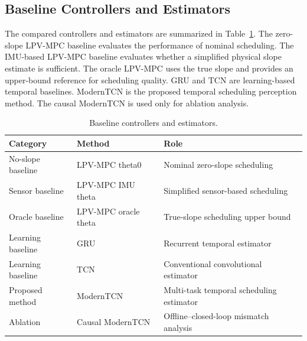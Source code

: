 \documentclass{ieeeaccess}
\begin{document}
\subsection{Baseline Controllers and Estimators}



The compared controllers and estimators are summarized in Table~\ref{tab:baseline_definitions}. The zero-slope LPV-MPC baseline evaluates the performance of nominal scheduling. The IMU-based LPV-MPC baseline evaluates whether a simplified physical slope estimate is sufficient. The oracle LPV-MPC uses the true slope and provides an upper-bound reference for scheduling quality. GRU and TCN are learning-based temporal baselines. ModernTCN is the proposed temporal scheduling perception method. The causal ModernTCN is used only for ablation analysis.



\begin{table}[t]

\centering

\caption{Baseline controllers and estimators.}

\label{tab:baseline_definitions}

\begin{tabular}{lll}

\hline

Category & Method & Role \\

\hline

No-slope baseline & LPV-MPC theta0 & Nominal zero-slope scheduling \\

Sensor baseline & LPV-MPC IMU theta & Simplified sensor-based scheduling \\

Oracle baseline & LPV-MPC oracle theta & True-slope scheduling upper bound \\

Learning baseline & GRU & Recurrent temporal estimator \\

Learning baseline & TCN & Conventional convolutional estimator \\

Proposed method & ModernTCN & Multi-task temporal scheduling estimator \\

Ablation & Causal ModernTCN & Offline--closed-loop mismatch analysis \\

\hline

\end{tabular}

\end{table}
\end{document}
